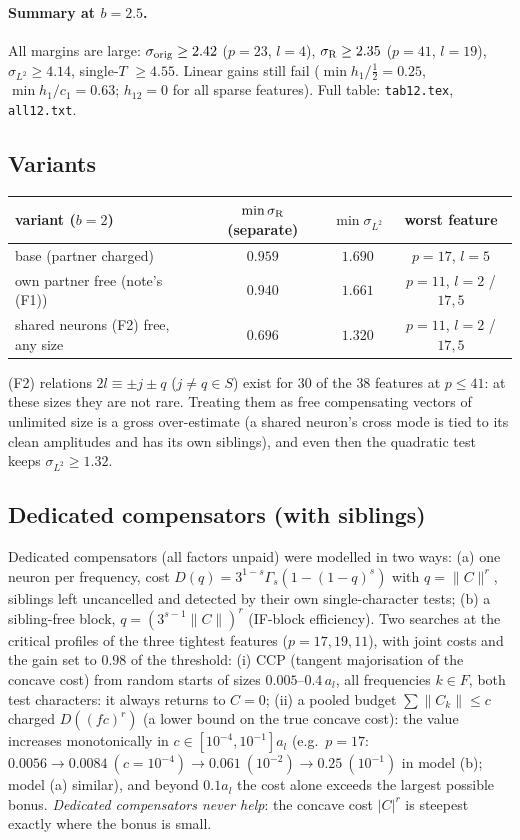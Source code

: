 \documentclass[11pt]{article}
\theoremstyle{definition}
\begin{document}
\paragraph{Summary at $b=2.5$.}  All margins are large: $\sigma_{\rm orig}\ge2.42$ ($p=23$, $l=4$), $\sigma_{\rm R}\ge2.35$ ($p=41$, $l=19$), $\sigma_{L^2}\ge4.14$,
single-$T$ $\ge4.55$.  Linear gains still fail ($\min h_1/\frac12=0.25$, $\min h_1/c_1=0.63$; $h_{12}=0$ for all sparse features).
Full table: \texttt{tab12.tex}, \texttt{all12.txt}.

\subsection{Variants}
\begin{center}\small
\begin{tabular}{lccc}
\toprule
variant ($b=2$) & $\min\sigma_{\rm R}$ (separate) & $\min\sigma_{L^2}$ & worst feature\\
\midrule
base (partner charged) & $0.959$ & $1.690$ & $p=17$, $l=5$\\
own partner free (note's (F1)) & $0.940$ & $1.661$ & $p=11$, $l=2$ / $17,5$\\
shared neurons (F2) free, any size & $0.696$ & $1.320$ & $p=11$, $l=2$ / $17,5$\\
\bottomrule
\end{tabular}
\end{center}
(F2) relations $2l\equiv\pm j\pm q$ ($j\ne q\in S$) exist for $30$ of the $38$ features at $p\le41$: at these sizes they are not rare.  Treating them as free
compensating vectors of unlimited size is a gross over-estimate (a shared neuron's cross mode is tied to its clean amplitudes and has its own siblings), and
even then the quadratic test keeps $\sigma_{L^2}\ge1.32$.

\subsection{Dedicated compensators (with siblings)}
Dedicated compensators (all factors unpaid) were modelled in two ways: (a) one neuron per frequency, cost $D(q)=3^{1-s}\Gamma_s(1-(1-q)^s)$ with
$q=\|C\|^{r}$, siblings left uncancelled and detected by their own single-character tests; (b) a sibling-free block, $q=(3^{s-1}\|C\|)^r$ (IF-block
efficiency).  Two searches at the critical profiles of the three tightest features ($p=17,19,11$), with joint costs and the gain set to $0.98$ of the
threshold: (i) CCP (tangent majorisation of the concave cost) from random starts of sizes $0.005$--$0.4\,a_l$, all frequencies $k\in F$, both test characters:
it always returns to $C=0$; (ii) a pooled budget $\sum\|C_k\|\le c$ charged $D((fc)^r)$ (a lower bound on the true concave cost): the value increases
monotonically in $c\in[10^{-4},10^{-1}]a_l$ (e.g.\ $p=17$: $0.0056\to0.0084\ (c=10^{-4})\to0.061\ (10^{-2})\to0.25\ (10^{-1})$ in model (b); model (a) similar),
and beyond $0.1a_l$ the cost alone exceeds the largest possible bonus.  \emph{Dedicated compensators never help}: the concave cost $|C|^r$ is steepest
exactly where the bonus is small.
\end{document}
